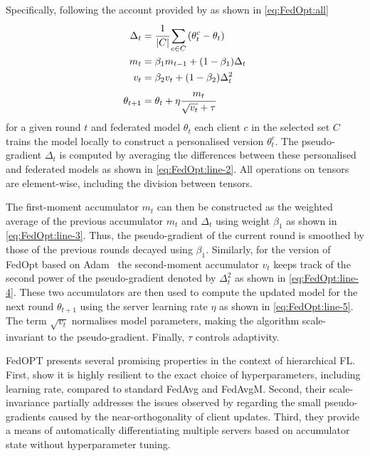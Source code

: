 Specifically, following the account provided by \citet{FedOPT} as shown in \cref{eq:FedOpt:all}
\begin{subequations}
    \begin{align}
        \Delta_t     & = \cfrac{1}{|C|} \sum_{c \in C} \left( \theta_t^c - \theta_t \right) \label{eq:FedOpt:line-2} \\
        m_t          & = \beta_1 m_{t-1} + (1-\beta_1) \Delta_t \label{eq:FedOpt:line-3}                             \\
        v_t          & = \beta_2 v_t + (1-\beta_2) \Delta_t^2 \label{eq:FedOpt:line-4}     \                         \\
        \theta_{t+1} & = \theta_t + \eta \cfrac{m_t}{\sqrt{v_t} + \tau} \label{eq:FedOpt:line-5}
    \end{align}\label{eq:FedOpt:all}
\end{subequations}
\noindent for a given round $t$ and federated model $\theta_t$  each client $c$ in the selected set $C$ trains the model locally to construct a personalised version $\theta_t^c$. The pseudo-gradient $\Delta_t$ is computed by averaging the differences between these personalised and federated models as shown in \cref{eq:FedOpt:line-2}. All operations on tensors are element-wise, including the division between tensors.

The first-moment accumulator $m_t$ can then be constructed as the weighted average of the previous accumulator $m_t$ and $\Delta_t$ using weight $\beta_1$ as shown in \cref{eq:FedOpt:line-3}. Thus, the pseudo-gradient of the current round is smoothed by those of the previous rounds decayed using $\beta_1$. Similarly, for the version of FedOpt based on Adam~\citep{Adam} the second-moment accumulator $v_t$  keeps track of the second power of the pseudo-gradient denoted by $\Delta_t^2$ as shown in \cref{eq:FedOpt:line-4}. These two accumulators are then used to compute the updated model for the next round $\theta_{t+1}$ using the server learning rate $\eta$ as shown in \cref{eq:FedOpt:line-5}. The term $\sqrt{v_t}$ normalises model parameters, making the algorithm scale-invariant to the pseudo-gradient. Finally, $\tau$ controls adaptivity\@.

FedOPT presents several promising properties in the context of hierarchical FL\@. First, \citet{FedOPT} show it is highly resilient to the exact choice of hyperparameters, including learning rate, compared to standard FedAvg and FedAvgM. Second, their scale-invariance partially addresses the issues observed by \citet{LargeCohorts} regarding the small pseudo-gradients caused by the near-orthogonality of client updates. Third, they provide a means of automatically differentiating multiple servers based on accumulator state without hyperparameter tuning.

